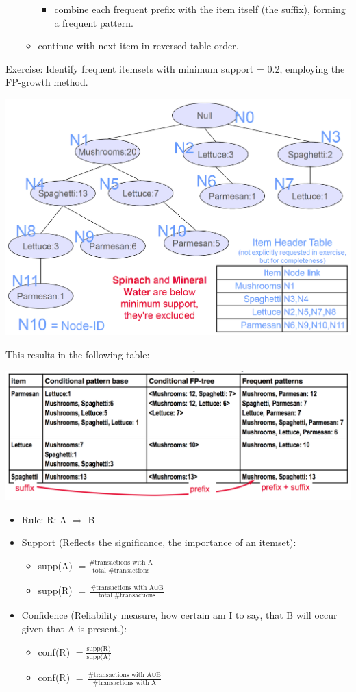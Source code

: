 \begin{breakbox}
\begin{itemize}
\begin{itemize}
\begin{itemize}
					\item combine each frequent prefix with the item itself (the suffix), forming a frequent pattern.
				\end{itemize}
			\item continue with next item in reversed table order.
		\end{itemize}
\end{itemize}
Exercise: Identify frequent itemsets with minimum support = 0.2, employing the FP-growth method.
\begin{center}
\includegraphics[width=.15\textwidth]{slides_images/fp_tree}
\end{center}
This results in the following table:
\begin{center}
\includegraphics[width=.15\textwidth]{slides_images/frequent_patterns}
\end{center}
\end{breakbox}

\begin{breakbox}
\begin{itemize}
	\item Rule: R: A $\Rightarrow$ B
	\item Support (Reflects the significance, the importance of an itemset):
		\begin{itemize}
			\item[] supp(A) $= \frac{\text{\#transactions with A}}{\text{total \#transactions}}$
			\item[] supp(R) $= \frac{\text{\#transactions with A} \cup \text{B}}{\text{total \#transactions}}$
		\end{itemize}
	\item Confidence (Reliability measure, how certain am I to say, that B will occur given that A is present.):
		\begin{itemize}
			\item[] conf(R) $= \frac{\text{supp(R)}}{\text{supp(A)}}$
			\item[] conf(R) $= \frac{\text{\#transactions with A} \cup \text{B}}{\text{\#transactions with A}}$
		\end{itemize}
\end{itemize}
\end{breakbox}


